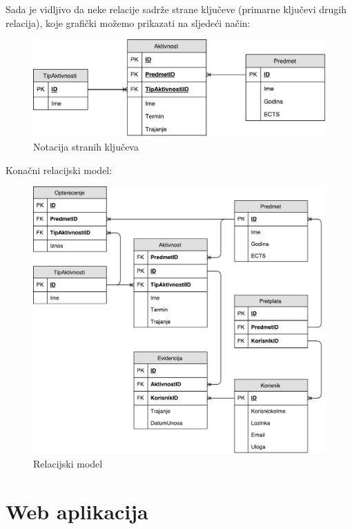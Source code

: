 \documentclass[times, utf8, zavrsni]{fer}
\begin{document}
Sada je vidljivo da neke relacije sadrže strane ključeve (primarne ključevi drugih relacija), koje grafički možemo prikazati na sljedeći način:

\begin{figure}[H]
\centering
\includegraphics[width=\textwidth,height=\textheight,keepaspectratio]{img/strani-kljucevi.pdf}
\caption{Notacija stranih ključeva}
\label{fig:strani-kljucevi}
\end{figure}

Konačni relacijski model:

\begin{figure}[H]
\centering
\includegraphics[width=\textwidth,height=\textheight,keepaspectratio]{img/relacijski-model.pdf}
\caption{Relacijski model}
\label{fig:relacijski-model}
\end{figure}

\lstset{language=SQL, tabsize=4}


\chapter{Web aplikacija}
\end{document}
